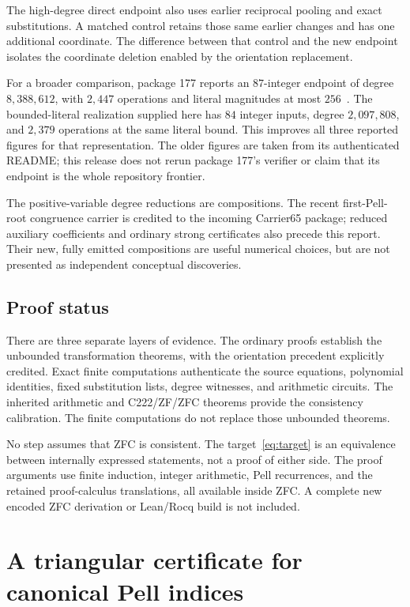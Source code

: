\documentclass[11pt,letterpaper]{article}
\theoremstyle{definition}\newtheorem{definition}[theorem]{Definition}
\theoremstyle{remark}\newtheorem{remark}[theorem]{Remark}
\begin{document}
The high-degree direct endpoint also uses earlier reciprocal pooling and exact substitutions. A matched control retains those same earlier changes and has one additional coordinate. The difference between that control and the new endpoint isolates the coordinate deletion enabled by the orientation replacement.

For a broader comparison, package 177 reports an $87$-integer endpoint of degree $8{,}388{,}612$, with $2{,}447$ operations and literal magnitudes at most $256$~\cite{oriented177}. The bounded-literal realization supplied here has $84$ integer inputs, degree $2{,}097{,}808$, and $2{,}379$ operations at the same literal bound. This improves all three reported figures for that representation. The older figures are taken from its authenticated README; this release does not rerun package 177's verifier or claim that its endpoint is the whole repository frontier.

The positive-variable degree reductions are compositions. The recent first-Pell-root congruence carrier is credited to the incoming Carrier65 package; reduced auxiliary coefficients and ordinary strong certificates also precede this report. Their new, fully emitted compositions are useful numerical choices, but are not presented as independent conceptual discoveries.

\subsection{Proof status}
There are three separate layers of evidence. The ordinary proofs establish the unbounded transformation theorems, with the orientation precedent explicitly credited. Exact finite computations authenticate the source equations, polynomial identities, fixed substitution lists, degree witnesses, and arithmetic circuits. The inherited arithmetic and C222/ZF/ZFC theorems provide the consistency calibration. The finite computations do not replace those unbounded theorems.

No step assumes that ZFC is consistent. The target~\eqref{eq:target} is an equivalence between internally expressed statements, not a proof of either side. The proof arguments use finite induction, integer arithmetic, Pell recurrences, and the retained proof-calculus translations, all available inside ZFC. A complete new encoded ZFC derivation or Lean/Rocq build is not included.

\section{A triangular certificate for canonical Pell indices}\label{sec:triangle}
\end{document}

